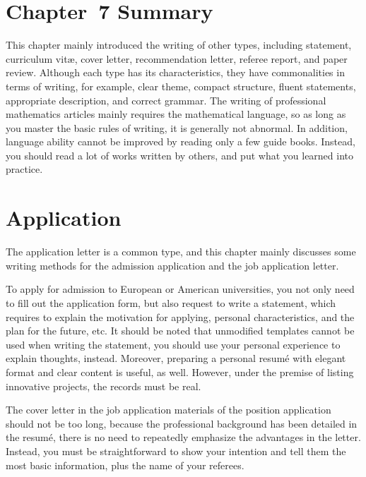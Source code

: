 \section{Chapter~7 Summary}
This chapter mainly introduced the writing of other types, including statement, curriculum vit\ae, cover letter, recommendation letter, referee report, and paper review. Although each type has its characteristics, they have commonalities in terms of writing, for example, clear theme, compact structure, fluent statements, appropriate description, and correct grammar. The writing of professional mathematics articles mainly requires the mathematical language, so as long as you master the basic rules of writing, it is generally not abnormal. In addition, language ability cannot be improved by reading only a few guide books. Instead, you should read a lot of works written by others, and put what you learned into practice.



\section{Application}
The application letter is a common type, and this chapter mainly discusses some writing methods for the admission application and the job application letter.

To apply for admission to European or American universities, you not only need to fill out the application form, but also request to write a statement, which requires to explain the motivation for applying, personal characteristics, and the plan for the future, etc. It should be noted that unmodified templates cannot be used when writing the statement, you should use your personal experience to explain thoughts, instead. Moreover, preparing a personal resum\'e with elegant format and clear content is useful, as well. However, under the premise of listing innovative projects, the records must be real.

The cover letter in the job application materials of the position application should not be too long, because the professional background has been detailed in the resum\'e, there is no need to repeatedly emphasize the advantages in the letter. Instead, you must be straightforward to show your intention and tell them the most basic information, plus the name of your referees.



